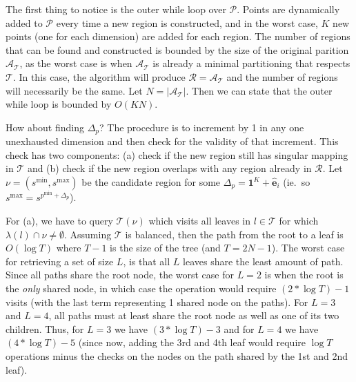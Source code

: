 

The first thing to notice is the outer while loop over $\mathcal{P}$. Points are
dynamically added to $\mathcal{P}$ every time a new region is constructed, and
in the worst case, $K$ new points (one for each dimension) are added for each
region. The number of regions that can be found and constructed is bounded by
the size of the original parition $\mathcal{A}_{\mathcal{T}}$, as the worst case
is when $\mathcal{A}_{\mathcal{T}}$ is already a minimal partitioning that
respects $\mathcal{T}$. In this case, the algorithm will produce $\mathcal{R} =
\mathcal{A}_{\mathcal{T}}$ and the number of regions will necessarily be the
same. Let $N = |\mathcal{A}_{\mathcal{T}}|$. Then we can state that the outer
while loop is bounded by $O(KN)$.


How about finding $\Delta_{p}$? The procedure is to increment by 1 in any one
unexhausted dimension and then check for the validity of that increment. This
check has two components: (a) check if the new region still has singular mapping
in $\mathcal{T}$ and (b) check if the new region overlaps with any region
already in $\mathcal{R}$. Let $\nu = (s^{\min}, s^{\max})$ be the candidate
region for some $\Delta_{p} = \mathbf{1}^{K} + \mathbf{\hat{e}}_{i}$ (ie.\ so
$s^{\max} = s^{p^{\min} + \Delta_{p}}$).

For (a), we have to query $\mathcal{T}(\nu)$ which visits all leaves in $l \in
\mathcal{T}$ for which $\lambda(l) \cap \nu \neq \emptyset$. Assuming
$\mathcal{T}$ is balanced, then the path from the root to a leaf is $O(\log
 T)$ where $T - 1$ is the size of the tree (and $T = 2N -1$). The worst case
for retrieving a set of size $L$, is that all $L$ leaves share the least amount
of path. Since all paths share the root node, the worst case for $L=2$ is when
the root is the \textit{only} shared node, in which case the operation would
require $(2 * \log T) - 1$ visits (with the last term representing 1 shared
node on the paths). For $L=3$ and $L=4$, all paths must at least share the root
node as well as one of its two children. Thus, for $L=3$ we have $(3 * \log T)
- 3$ and for $L=4$ we have $(4 * \log T) - 5$ (since now, adding the 3rd and
4th leaf would require $\log T$ operations minus the checks on the nodes on the
path shared by the 1st and 2nd leaf).

